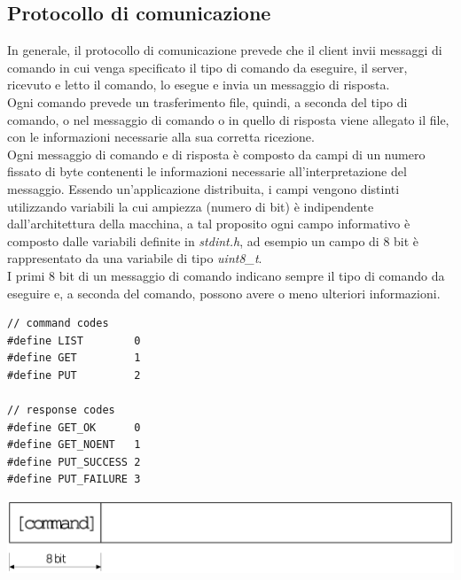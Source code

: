 \subsection{Protocollo di comunicazione}
In generale, il protocollo di comunicazione prevede che il client invii messaggi di comando in cui venga specificato il tipo di comando da eseguire, il server, ricevuto e letto il comando, lo esegue e invia un messaggio di risposta.\\
Ogni comando prevede un trasferimento file, quindi, a seconda del tipo di comando, o nel messaggio di comando o in quello di risposta viene allegato il file, con le informazioni necessarie alla sua corretta ricezione.\\
Ogni messaggio di comando e di risposta è composto da campi di un numero fissato di byte contenenti le informazioni necessarie all'interpretazione del messaggio.
Essendo un'applicazione distribuita, i campi vengono distinti utilizzando variabili la cui ampiezza (numero di bit) è indipendente dall'architettura della macchina, a tal proposito ogni campo informativo è composto dalle variabili definite in \emph{stdint.h}, ad esempio un campo di 8 bit è rappresentato da una variabile di tipo \emph{uint8\_t}.\\ 
I primi 8 bit di un messaggio di comando indicano sempre il tipo di comando da eseguire e, a seconda del comando, possono avere o meno ulteriori informazioni.

\begin{lstlisting}[title=Costanti comandi]
// command codes
#define LIST 		0
#define GET 		1
#define PUT 		2

// response codes
#define GET_OK      0
#define GET_NOENT   1
#define PUT_SUCCESS 2
#define PUT_FAILURE 3
\end{lstlisting}

\includegraphics[scale=0.35]{images/gen_message}

